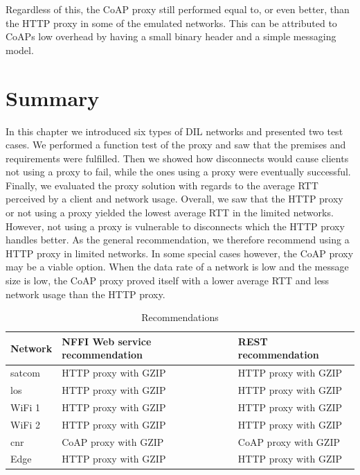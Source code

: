 Regardless of this, the CoAP proxy still performed equal to, or even better,
than the HTTP proxy in some of the emulated networks. This can be attributed to
CoAPs low overhead by having a small binary header and a simple messaging model.


\section{Summary}

In this chapter we introduced six types of DIL networks and presented two test
cases. We performed a function test of the proxy and saw that the premises and
requirements were fulfilled. Then we showed how disconnects would cause clients
not using a proxy to fail, while the ones using a proxy were eventually
successful. Finally, we evaluated the proxy solution with regards to the average
RTT perceived by a client and network usage. Overall, we saw that the HTTP proxy
or not using a proxy yielded the lowest average RTT in the limited networks.
However, not using a proxy is vulnerable to disconnects which the HTTP proxy
handles better. As the general recommendation, we therefore recommend using a
HTTP proxy in limited networks. In some special cases however, the CoAP proxy
may be a viable option. When the data rate of a network is low and the message
size is low, the CoAP proxy proved itself with a lower average RTT and less
network usage than the HTTP proxy.

\begin{table}[h]
\begin{tabular}{| l | l | l |}
\hline
  \textbf{Network} & \textbf{NFFI Web service recommendation} & \textbf{REST recommendation}\\ \hline
  \gls{satcom} & HTTP proxy with GZIP & HTTP proxy with GZIP \\ \hline
  \gls{los} & HTTP proxy with GZIP  & HTTP proxy with GZIP \\ \hline
  WiFi 1 & HTTP proxy with GZIP & HTTP proxy with GZIP \\ \hline
  WiFi 2 & HTTP proxy with GZIP & HTTP proxy with GZIP \\ \hline
  \gls{cnr} & CoAP proxy with GZIP & CoAP proxy with GZIP \\ \hline
  Edge & HTTP proxy with GZIP & HTTP proxy with GZIP \\ \hline
\end{tabular}
\caption{Recommendations}
\label{table-evaluation-summary}
\end{table}
